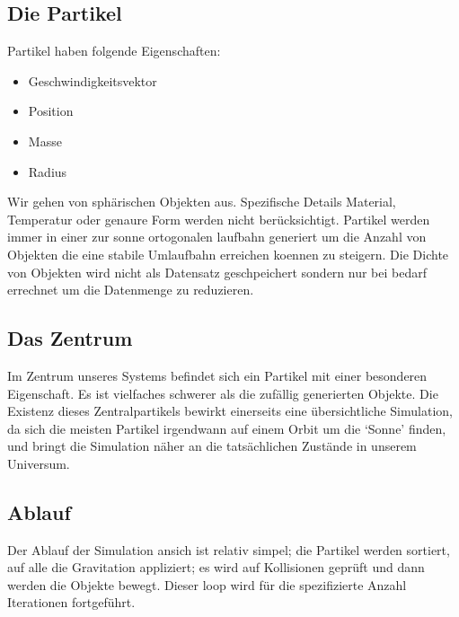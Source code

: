 
\subsection{Die Partikel}
Partikel haben folgende Eigenschaften:
\begin{itemize}
    \item Geschwindigkeitsvektor
    \item Position
    \item Masse
    \item Radius
\end{itemize}
Wir gehen von sphärischen Objekten aus. Spezifische Details
Material, Temperatur oder genaure Form werden nicht berücksichtigt.
Partikel werden immer in einer zur sonne ortogonalen laufbahn generiert
um die Anzahl von Objekten die eine stabile Umlaufbahn erreichen koennen
zu steigern. Die Dichte von Objekten wird nicht als Datensatz geschpeichert
sondern nur bei bedarf errechnet um die Datenmenge zu reduzieren.

\subsection{Das Zentrum}
Im Zentrum unseres Systems befindet sich ein Partikel mit einer besonderen
Eigenschaft. Es ist vielfaches schwerer als die zufällig generierten Objekte.
Die Existenz dieses Zentralpartikels bewirkt einerseits eine übersichtliche Simulation,
da sich die meisten Partikel irgendwann auf einem Orbit um die `Sonne' finden,
und bringt die Simulation näher an die tatsächlichen Zustände in unserem Universum.

\subsection{Ablauf}
Der Ablauf der Simulation ansich ist relativ simpel; die Partikel werden sortiert,
auf alle die Gravitation appliziert; es wird auf Kollisionen geprüft und dann werden
die Objekte bewegt. Dieser loop wird für die spezifizierte Anzahl Iterationen
fortgeführt.

